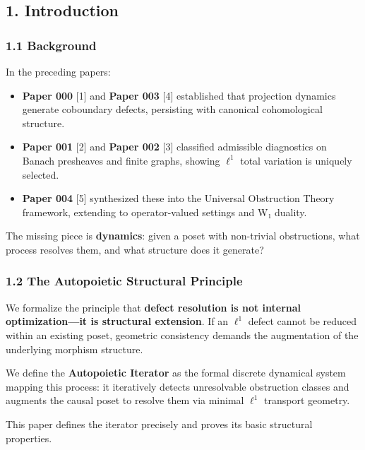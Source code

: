 \documentclass[
]{article}
\providecommand{\tightlist}{%
  \setlength{\itemsep}{0pt}\setlength{\parskip}{0pt}}
\begin{document}
\subsection{1. Introduction}\label{introduction}

\subsubsection{1.1 Background}\label{background}

In the preceding papers:

\begin{itemize}
\tightlist
\item
  \textbf{Paper 000} {[}1{]} and \textbf{Paper 003} {[}4{]} established
  that projection dynamics generate coboundary defects, persisting with
  canonical cohomological structure.
\item
  \textbf{Paper 001} {[}2{]} and \textbf{Paper 002} {[}3{]} classified
  admissible diagnostics on Banach presheaves and finite graphs, showing
  \(\ell^1\) total variation is uniquely selected.
\item
  \textbf{Paper 004} {[}5{]} synthesized these into the Universal
  Obstruction Theory framework, extending to operator-valued settings
  and W₁ duality.
\end{itemize}

The missing piece is \textbf{dynamics}: given a poset with non-trivial
obstructions, what process resolves them, and what structure does it
generate?

\subsubsection{1.2 The Autopoietic Structural
Principle}\label{the-autopoietic-structural-principle}

We formalize the principle that \textbf{defect resolution is not
internal optimization---it is structural extension}. If an \(\ell^1\)
defect cannot be reduced within an existing poset, geometric consistency
demands the augmentation of the underlying morphism structure.

We define the \textbf{Autopoietic Iterator} as the formal discrete
dynamical system mapping this process: it iteratively detects
unresolvable obstruction classes and augments the causal poset to
resolve them via minimal \(\ell^1\) transport geometry.

This paper defines the iterator precisely and proves its basic
structural properties.
\end{document}
